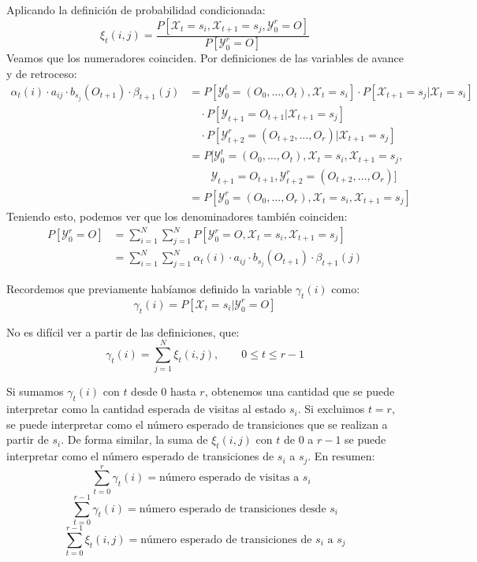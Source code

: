 \begin{proofs*}
Aplicando la definición de probabilidad condicionada:
\[\xi_t(i,j)=\frac{P[\mathcal{X}_t=s_i,\mathcal{X}_{t+1}=s_j,\mathcal{Y}_0^r=O]}{P[\mathcal{Y}_0^r=O]}\]
Veamos que los numeradores coinciden. Por definiciones de las variables de avance y de retroceso:
\[
\begin{aligned}
    \alpha_t(i)\cdot a_{ij}\cdot b_{s_j}(O_{t+1})\cdot\beta_{t+1}(j)&=P[\mathcal{Y}_0^t=(O_0,\dots,O_t),\mathcal{X}_t=s_i]\cdot P[\mathcal{X}_{t+1}=s_j|\mathcal{X}_t=s_i]\\
    &\quad\cdot P[\mathcal{Y}_{t+1}=O_{t+1}|\mathcal{X}_{t+1}=s_j]\\
    &\quad\cdot P[\mathcal{Y}_{t+2}^r=(O_{t+2},\dots,O_r)|\mathcal{X}_{t+1}=s_j]\\
    &=P[\mathcal{Y}_0^t=(O_0,\dots,O_t),\mathcal{X}_t=s_i,\mathcal{X}_{t+1}=s_j,\\
    &\qquad\mathcal{Y}_{t+1}=O_{t+1},\mathcal{Y}_{t+2}^r=(O_{t+2},\dots,O_r)]\\
    &=P[\mathcal{Y}_0^r=(O_0,\dots,O_r),\mathcal{X}_t=s_i,\mathcal{X}_{t+1}=s_j]
\end{aligned}
\]
Teniendo esto, podemos ver que los denominadores también coinciden:
\begin{align*}
    P[\mathcal{Y}_{0}^r=O]&= \sum_{i=1}^N\sum_{j=1}^N P[\mathcal{Y}_0^r=O,\mathcal{X}_t=s_i,\mathcal{X}_{t+1}=s_j]\\
    &=\sum_{i=1}^N\sum_{j=1}^N\alpha_t(i)\cdot a_{ij}\cdot b_{s_j}(O_{t+1})\cdot\beta_{t+1}(j) \tag*{\qedsymbol}
\end{align*}

\end{proofs*}

Recordemos que previamente habíamos definido la variable $\gamma_t(i)$ como:
\[\gamma_t(i)=P[\mathcal{X}_t=s_i|\mathcal{Y}_0^r=O]\]

No es difícil ver a partir de las definiciones, que:
\[\gamma_t(i)=\sum_{j=1}^N\xi_t(i,j), \qquad 0\leq t\leq r-1\]

Si sumamos $\gamma_t(i)$ con $t$ desde $0$ hasta $r$, obtenemos una cantidad que se puede interpretar como la cantidad esperada de visitas al estado $s_i$. Si excluimos $t=r$, se puede interpretar como el número esperado de transiciones que se realizan a partir de $s_i$. De forma similar, la suma de $\xi_t(i,j)$ con $t$ de $0$ a $r-1$ se puede interpretar como el número esperado de transiciones de $s_i$ a $s_j$. En resumen:
\[\sum_{t=0}^{r}\gamma_t(i)=\text{número esperado de visitas a $s_i$ }\]
\[\sum_{t=0}^{r-1}\gamma_t(i)=\text{número esperado de transiciones desde } s_i\]
\[\sum_{t=0}^{r-1}\xi_t(i,j)=\text{número esperado de transiciones de } s_i \text{ a } s_j\]

